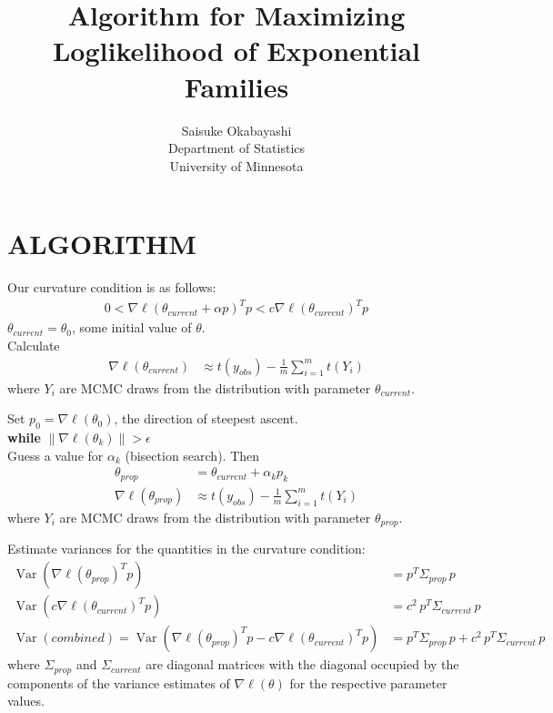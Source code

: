\documentclass{amsbook}
\title{Algorithm for Maximizing Loglikelihood of Exponential Families}
\author{Saisuke Okabayashi \\ Department of Statistics \\ University of Minnesota}
\DeclareMathOperator{\Var}{Var}
\theoremstyle{definition}
\theoremstyle{remark}
\begin{document}
\maketitle

\section{ALGORITHM} 
Our curvature condition is as follows:
\begin{align*}
	0 < \nabla \ell( \theta_{current} + \alpha p ) ^T p < c \nabla \ell( \theta_
{current}) ^T p
\end{align*}
$\theta_{current} = \theta_0$, some initial value of $\theta$.\\ 
Calculate
\begin{align*}
	\nabla \ell( \theta_{current} ) &\approx t( y_{obs}) - \frac{1}{m} \sum_{i=1}^m t
( Y_i)
\end{align*}
where $Y_i$ are MCMC draws from the distribution with parameter $\theta_{current}$.

\noindent Set $p_0 = \nabla \ell( \theta_0)$, the direction of steepest ascent. \\

\noindent \textbf{while}  $\parallel \nabla \ell( \theta_k) \parallel > \epsilon$ \\ 
\hspace{4mm} 
\indent Guess a value for $\alpha_k$ (bisection search).  Then
\begin{align*}
	\theta_{prop} &= \theta_{current} + \alpha_k p_k \\
	\nabla \ell( \theta_{prop} ) &\approx t( y_{obs}) - \frac{1}{m} \sum_{i=1}^m t
( Y_i)
\end{align*}
\indent where $Y_i$ are MCMC draws from the distribution with parameter $\theta_
{prop}$.

\indent Estimate variances for the quantities in the curvature condition:
\begin{align*}
	\Var \left( \nabla \ell(\theta_{prop})^T p \right ) &= p^T \Sigma_{prop} \, p \\
	\Var \left( c \nabla \ell(\theta_{current})^T p \right ) &= c^2 \,p^T \Sigma_
{current} \, p \\
	\Var(combined) = \Var \left( \nabla \ell(\theta_{prop})^T p - c \nabla \ell
(\theta_{current})^T p \right ) &=  p^T \Sigma_{prop} \, p + c^2 \, p^T \Sigma_
{current} \, p 
\end{align*}
where $\Sigma_{prop}$ and $\Sigma_{current}$ are diagonal matrices with the diagonal 
occupied by the components of the variance estimates of $\nabla \ell(\theta )$ for 
the respective parameter values. \\
\end{document}
